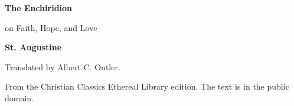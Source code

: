 \documentclass[11pt,letterpaper]{article}
\begin{document}
\color{ink}

\begin{titlepage}
\centering
\vspace*{4em}
{\LARGE\bfseries\color{heading} The Enchiridion\par}
\vspace{1em}
{\large on Faith, Hope, and Love\par}
\vspace{2em}
{\LARGE\bfseries\color{heading} St. Augustine\par}
\vspace{3em}
{Translated by Albert C. Outler.\par}
\vfill
{\small From the Christian Classics Ethereal Library edition. The text is in
the public domain.\par}
\vspace{2em}
\end{titlepage}

\tableofcontents
\clearpage


\end{document}
